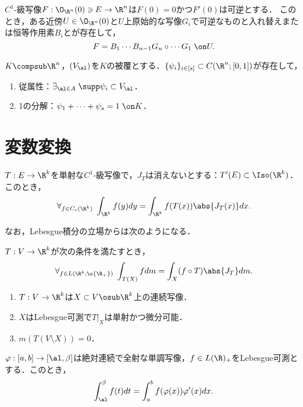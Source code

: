 \documentclass[uplatex, dvipdfmx]{jsreport}
\begin{document}
\begin{theorem}[原始的写像への分解]
    $C^1$-級写像$F:\O_{\R^n}(0)\ni E\to\R^n$は$F(0)=0$かつ$F'(0)$は可逆とする．
    このとき，ある近傍$U\in\O_{\R^n}(0)$と$U$上原始的な写像$G_i$で可逆なものと入れ替えまたは恒等作用素$B_i$とが存在して，
    \[F=B_1\cdots B_{n-1}G_n\circ\cdots G_1\;\on U.\]
\end{theorem}

\begin{theorem}
    $K\compsub\R^n$，$(V_\al)$を$K$の被覆とする．$\{\psi_i\}_{i\in[s]}\subset C(\R^n;[0,1])$が存在して，
    \begin{enumerate}
        \item 従属性：$\exists_{\al\in A}\;\supp\psi_i\subset V_\al$．
        \item 1の分解：$\psi_1+\cdots+\psi_s=1\;\on K$．
    \end{enumerate}
\end{theorem}

\section{変数変換}

\begin{theorem}
    $T:E\to\R^k$を単射な$C^1$-級写像で，$J_T$は消えないとする：$T'(E)\subset\Iso(\R^k)$．
    このとき，
    \[\forall_{f\in C_c(\R^k)}\;\int_{\R^k}f(y)dy=\int_{\R^k}f(T(x))\abs{J_T(x)}dx.\]
\end{theorem}

なお，Lebesgue積分の立場からは次のようになる．

\begin{theorem}
    $T:V\to\R^k$が次の条件を満たすとき，
    \[\forall_{f\in L(\R^k;\o{\R_+})}\;\int_{T(X)}fdm=\int_X(f\circ T)\abs{J_T}dm.\]
    \begin{enumerate}
        \item $T:V\to\R^k$は$X\subset V\osub\R^k$上の連続写像．
        \item $X$はLebesgue可測で$T|_X$は単射かつ微分可能．
        \item $m(T(V\setminus X))=0$．
    \end{enumerate}
\end{theorem}

\begin{corollary}
    $\varphi:[a,b]\to[\al,\beta]$は絶対連続で全射な単調写像，$f\in L(\R)_+$をLebesgue可測とする．このとき，
    \[\int^\beta_\al f(t)dt=\int^b_af(\varphi(x))\varphi'(x)dx.\]
\end{corollary}
\end{document}
